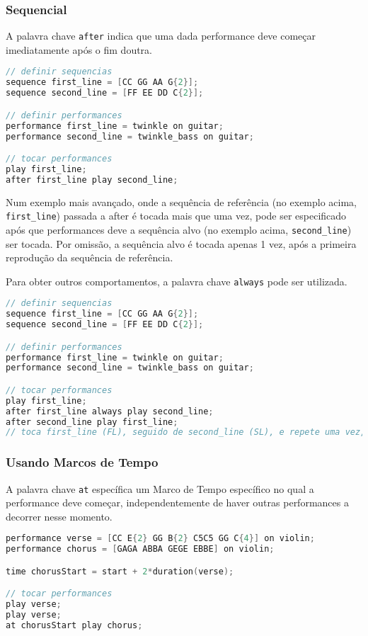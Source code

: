 \documentclass{article}
\begin{document}
\subsubsection{Sequencial}
A palavra chave \texttt{after} indica que uma dada performance deve começar imediatamente após o fim doutra.
\begin{lstlisting}[language=C]
// definir sequencias
sequence first_line = [CC GG AA G{2}];
sequence second_line = [FF EE DD C{2}];

// definir performances
performance first_line = twinkle on guitar;
performance second_line = twinkle_bass on guitar;

// tocar performances
play first_line;
after first_line play second_line;
\end{lstlisting}

Num exemplo mais avançado, onde a sequência de referência (no exemplo acima, \texttt{first\_line}) passada a after é tocada mais que uma vez, pode ser especificado após que performances deve a sequência alvo (no exemplo acima, \texttt{second\_line}) ser tocada. Por omissão, a sequência alvo é tocada apenas 1 vez, após a primeira reprodução da sequência de referência. 

Para obter outros comportamentos, a palavra chave \texttt{always} pode ser utilizada.

\begin{lstlisting}[language=C]
// definir sequencias
sequence first_line = [CC GG AA G{2}];
sequence second_line = [FF EE DD C{2}];

// definir performances
performance first_line = twinkle on guitar;
performance second_line = twinkle_bass on guitar;

// tocar performances
play first_line;
after first_line always play second_line;
after second_line play first_line;
// toca first_line (FL), seguido de second_line (SL), e repete uma vez, ou seja, FL, SL, FL, SL
\end{lstlisting}


\subsubsection{Usando Marcos de Tempo}
A palavra chave \texttt{at} específica um Marco de Tempo específico no qual a performance deve começar, independentemente de haver outras performances a decorrer nesse momento. 
\begin{lstlisting}[language=C]
performance verse = [CC E{2} GG B{2} C5C5 GG C{4}] on violin;
performance chorus = [GAGA ABBA GEGE EBBE] on violin;

time chorusStart = start + 2*duration(verse);

// tocar performances
play verse;
play verse;
at chorusStart play chorus;
\end{lstlisting}
\end{document}
